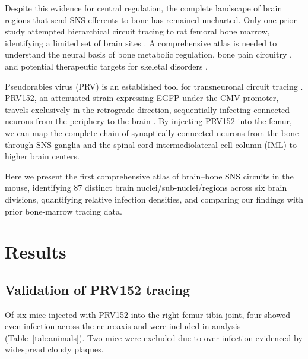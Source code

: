 \documentclass[11pt]{article}
\begin{document}
Despite this evidence for central regulation, the complete landscape of brain regions that send SNS efferents to bone has remained uncharted. Only one prior study attempted hierarchical circuit tracing to rat femoral bone marrow, identifying a limited set of brain sites \citep{engblom2008}. A comprehensive atlas is needed to understand the neural basis of bone metabolic regulation, bone pain circuitry \citep{mantyh2014, basbaum2009}, and potential therapeutic targets for skeletal disorders \citep{loeser2012, sohn2017}.

Pseudorabies virus (PRV) is an established tool for transneuronal circuit tracing \citep{card2011, card1993}. PRV152, an attenuated strain expressing EGFP under the CMV promoter, travels exclusively in the retrograde direction, sequentially infecting connected neurons from the periphery to the brain \citep{smith2000}. By injecting PRV152 into the femur, we can map the complete chain of synaptically connected neurons from the bone through SNS ganglia and the spinal cord intermediolateral cell column (IML) to higher brain centers.

Here we present the first comprehensive atlas of brain--bone SNS circuits in the mouse, identifying 87 distinct brain nuclei/sub-nuclei/regions across six brain divisions, quantifying relative infection densities, and comparing our findings with prior bone-marrow tracing data.

\section{Results}

\subsection{Validation of PRV152 tracing}

Of six mice injected with PRV152 into the right femur-tibia joint, four showed even infection across the neuroaxis and were included in analysis (Table~\ref{tab:animals}). Two mice were excluded due to over-infection evidenced by widespread cloudy plaques.
\end{document}
